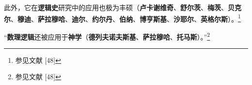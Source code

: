 此外，它在\textbf{逻辑史}研究中的应用也极为丰硕（\textbf{卢卡谢维奇}、\textbf{舒尔茨}、\textbf{梅茨}、\textbf{贝克尔}、\textbf{穆迪}、\textbf{萨拉穆哈}、\textbf{迪尔}、\textbf{约尔丹}、\textbf{伯纳}、\textbf{博亨斯基}、\textbf{沙耶尔}、\textbf{英格尔斯}）。\footnote{参见文献 [48]}

“\textbf{数理逻辑}还被应用于\textbf{神学}（\textbf{德列夫诺夫斯基}、\textbf{萨拉穆哈}、\textbf{托马斯}）。”\footnote{参见文献 [48]}

